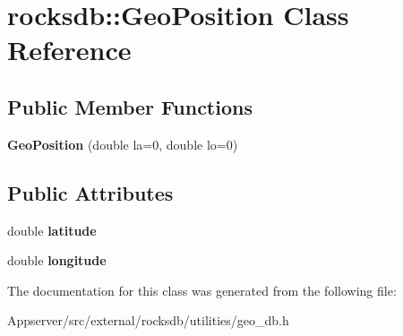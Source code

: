\hypertarget{classrocksdb_1_1GeoPosition}{}\section{rocksdb\+:\+:Geo\+Position Class Reference}
\label{classrocksdb_1_1GeoPosition}
\subsection*{Public Member Functions}
\begin{DoxyCompactItemize}
\item 
{\bfseries Geo\+Position} (double la=0, double lo=0)\hypertarget{classrocksdb_1_1GeoPosition_a2891539580cdc2d162d3861f785412b2}{}\label{classrocksdb_1_1GeoPosition_a2891539580cdc2d162d3861f785412b2}

\end{DoxyCompactItemize}
\subsection*{Public Attributes}
\begin{DoxyCompactItemize}
\item 
double {\bfseries latitude}\hypertarget{classrocksdb_1_1GeoPosition_aed89917cab50fcdc3b8e8ed38e9c9e6d}{}\label{classrocksdb_1_1GeoPosition_aed89917cab50fcdc3b8e8ed38e9c9e6d}

\item 
double {\bfseries longitude}\hypertarget{classrocksdb_1_1GeoPosition_a554149b696189e7fe8a622a51caa0f2a}{}\label{classrocksdb_1_1GeoPosition_a554149b696189e7fe8a622a51caa0f2a}

\end{DoxyCompactItemize}


The documentation for this class was generated from the following file\+:\begin{DoxyCompactItemize}
\item 
Appserver/src/external/rocksdb/utilities/geo\+\_\+db.\+h\end{DoxyCompactItemize}

